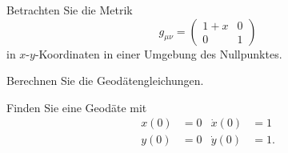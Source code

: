 Betrachten Sie die Metrik
\[
g_{\mu\nu}
=
\begin{pmatrix}
1+x&0\\
0  &1
\end{pmatrix}
\]
in $x$-$y$-Koordinaten in einer Umgebung des Nullpunktes.
\begin{teilaufgaben}
\item
Berechnen Sie die Geodätengleichungen.
\item
Finden Sie eine Geodäte mit
\begin{equation}
\begin{aligned}
x(0)&=0&\dot x(0)&=1\\
y(0)&=0&\dot y(0)&=1.
\end{aligned}
\label{uebung:0301:anfangswerte}
\end{equation}
\end{teilaufgaben}

